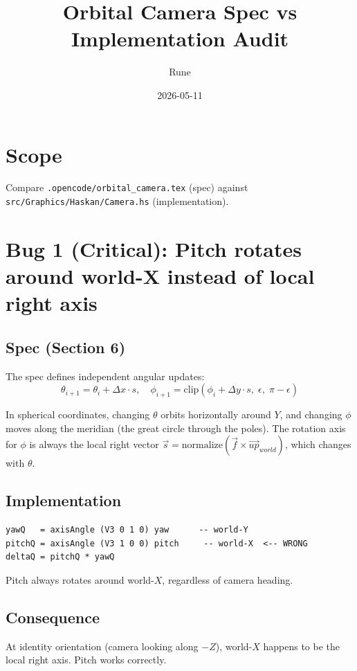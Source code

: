 \documentclass{article}
\title{Orbital Camera Spec vs Implementation Audit}
\author{Rune}
\date{2026-05-11}
\begin{document}
\maketitle

\section{Scope}

Compare \texttt{.opencode/orbital\_camera.tex} (spec) against
\texttt{src/Graphics/Haskan/Camera.hs} (implementation).

\section{Bug 1 (Critical): Pitch rotates around world-X instead of local right axis}

\subsection{Spec (Section 6)}

The spec defines independent angular updates:
\[
\theta_{i+1} = \theta_i + \Delta x \cdot s, \quad
\phi_{i+1} = \text{clip}(\phi_i + \Delta y \cdot s,\; \epsilon,\; \pi - \epsilon)
\]

In spherical coordinates, changing $\theta$ orbits horizontally around $Y$,
and changing $\phi$ moves along the meridian (the great circle through the poles).
The rotation axis for $\phi$ is always the local right vector
$\vec{s} = \text{normalize}(\vec{f} \times \vec{up}_{world})$,
which changes with $\theta$.

\subsection{Implementation}

\begin{verbatim}
yawQ   = axisAngle (V3 0 1 0) yaw      -- world-Y
pitchQ = axisAngle (V3 1 0 0) pitch     -- world-X  <-- WRONG
deltaQ = pitchQ * yawQ
\end{verbatim}

Pitch always rotates around world-$X$, regardless of camera heading.

\subsection{Consequence}

At identity orientation (camera looking along $-Z$), world-$X$ happens to be
the local right axis. Pitch works correctly.
\end{document}
